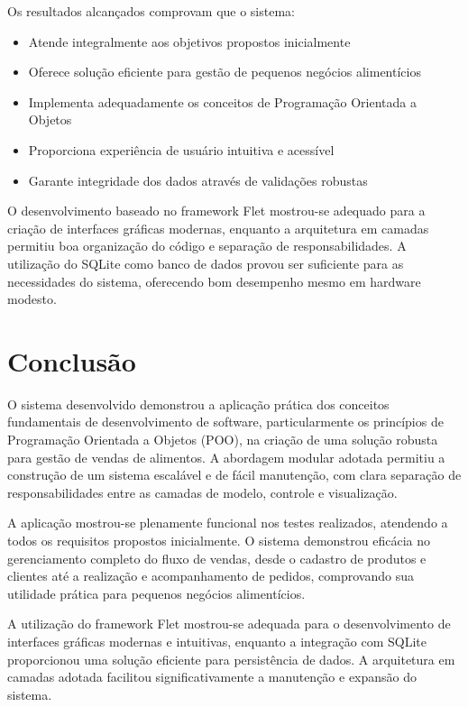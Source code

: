 \documentclass[conference]{IEEEtran}
\begin{document}
Os resultados alcançados comprovam que o sistema:

\begin{itemize}
    \item Atende integralmente aos objetivos propostos inicialmente
    \item Oferece solução eficiente para gestão de pequenos negócios alimentícios
    \item Implementa adequadamente os conceitos de Programação Orientada a Objetos
    \item Proporciona experiência de usuário intuitiva e acessível
    \item Garante integridade dos dados através de validações robustas
\end{itemize}

O desenvolvimento baseado no framework Flet mostrou-se adequado para a criação de interfaces gráficas modernas, enquanto a arquitetura em camadas permitiu boa organização do código e separação de responsabilidades. A utilização do SQLite como banco de dados provou ser suficiente para as necessidades do sistema, oferecendo bom desempenho mesmo em hardware modesto.

\section{Conclusão}

O sistema desenvolvido demonstrou a aplicação prática dos conceitos fundamentais de desenvolvimento de software, particularmente os princípios de Programação Orientada a Objetos (POO), na criação de uma solução robusta para gestão de vendas de alimentos. A abordagem modular adotada permitiu a construção de um sistema escalável e de fácil manutenção, com clara separação de responsabilidades entre as camadas de modelo, controle e visualização.

A aplicação mostrou-se plenamente funcional nos testes realizados, atendendo a todos os requisitos propostos inicialmente. O sistema demonstrou eficácia no gerenciamento completo do fluxo de vendas, desde o cadastro de produtos e clientes até a realização e acompanhamento de pedidos, comprovando sua utilidade prática para pequenos negócios alimentícios.

A utilização do framework Flet mostrou-se adequada para o desenvolvimento de interfaces gráficas modernas e intuitivas, enquanto a integração com SQLite proporcionou uma solução eficiente para persistência de dados. A arquitetura em camadas adotada facilitou significativamente a manutenção e expansão do sistema.
\end{document}
